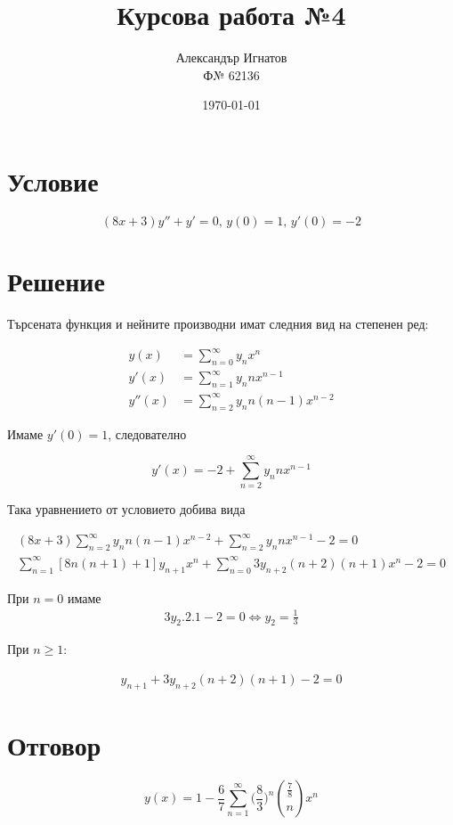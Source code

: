 \documentclass{article}
\title{Курсова работа №4}
\author{Александър Игнатов \\ Ф№ 62136 }
\date{\today}
\begin{document}
\maketitle

\section*{Условие}

\[
    (8x+3)y'' + y' = 0,\, y(0) = 1,\, y'(0) = -2
\]

\section*{Решение}

Търсената функция и нейните производни имат следния вид на степенен ред:

\begin{align*}
    y(x) &= \sum_{n=0}^{\infty} y_n x^n \\
    y'(x) &= \sum_{n=1}^{\infty} y_n n x^{n-1} \\
    y''(x) &= \sum_{n=2}^{\infty} y_n n(n-1) x^{n-2}
\end{align*}

Имаме \( y'(0) = 1 \), следователно

\[
    y'(x) = -2 + \sum_{n=2}^{\infty} y_n n x^{n-1}
\]

Така уравнението от условието добива вида

\begin{gather*}
    (8x+3)\sum_{n=2}^\infty y_n n(n-1)x^{n-2} + \sum_{n=2} ^\infty y_n n x^{n-1} - 2 = 0 \\
    \sum_{n=1}^\infty [8n(n+1) + 1]y_{n+1}x^n + \sum_{n=0}^\infty 3y_{n+2}(n+2)(n+1)x^n - 2 = 0
\end{gather*}

При \( n = 0 \) имаме
\begin{gather*}
    3y_2 . 2 . 1 - 2 = 0 \Longleftrightarrow y_2 = \frac{1}{3}
\end{gather*}

При \( n \geq 1 \):

\begin{gather*}
    [8n(n+1) + 1]y_{n+1} + 3y_{n+2}(n+2)(n+1) - 2 = 0
\end{gather*}

\section*{Отговор}

\[
    y(x) = 1 - \frac{6}{7}\sum_{n=1}^{\infty} \bigg(\frac{8}{3}\bigg)^n \binom{\frac{7}{8}}{n} x^n
\]
\end{document}
